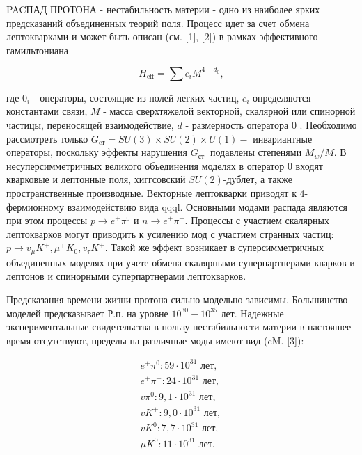 \documentclass[10pt]{article}
\begin{document}
PACПАД ПРОТОНА - нестабильность материи - одно из наиболее ярких предсказаний объединенных теорий поля. Процесс идет за счет обмена лептокварками и может быть описан (см. [1], [2]) в рамках эффективного гамильтониана



\[

H_{\mathrm{eff}}=\sum c_{i} M^{4-d_{0}},

\]



где $0_{i}$ - операторы, состоящие из полей легких частиц, $c_{i}$ определяются константами связи, $M$ - масса сверхтяжелой векторной, скалярной или спинорной частицы, переносящей взаимодействие, $d$ - размерность оператора 0 . Необходимо рассмотреть только $G_{\mathrm{cт}}=S U(3) \times S U(2) \times U(1)-$ инвариантные операторы, поскольку эффекты нарушения $G_{\text {ст }}$ подавлены степенями $M_{w} / M$. В несуперсимметричных великого объединения моделях в оператор 0 входят кварковые и лептонные поля, хиггсовский $S U(2)$-дублет, а также пространственные производные. Векторные лептокварки приводят к 4-фермионному взаимодействию вида qqql. Основными модами распада являются при этом процессы $p \rightarrow e^{+} \pi^{0}$ и $n \rightarrow e^{+} \pi^{-}$. Процессы с участием скалярных лептокварков могут приводить к усилению мод с участием странных частиц: $p \rightarrow \bar{v}_{\mu} K^{+}, \mu^{+} K_{0}, \bar{v}_{\tau} K^{+}$. Такой же эффект возникает в суперсимметричных объединенных моделях при учете обмена скалярными суперпартнерами кварков и лептонов и спинорными суперпартнерами лептокварков.



Предсказания времени жизни протона сильно модельно зависимы. Большинство моделей предсказывает Р.п. на уровне $10^{30}-10^{35}$ лет. Надежные экспериментальные свидетельства в пользу нестабильности материи в настояшее время отсутствуют, пределы на различные моды имеют вид (cM. [3]):



\[

\begin{aligned}

e^{+} \pi^{0}: 59 \cdot 10^{31} \text { лет, } \\

e^{+} \pi^{-}: 24 \cdot 10^{31} \text { лет, } \\

v \pi^{0}: 9,1 \cdot 10^{31} \text { лет, } \\

v K^{+}: 9,0 \cdot 10^{31} \text { лет, } \\

v K^{0}: 7,7 \cdot 10^{31} \text { лет, } \\

\mu K^{0}: 11 \cdot 10^{31} \text { лет. }

\end{aligned}

\]
\end{document}
